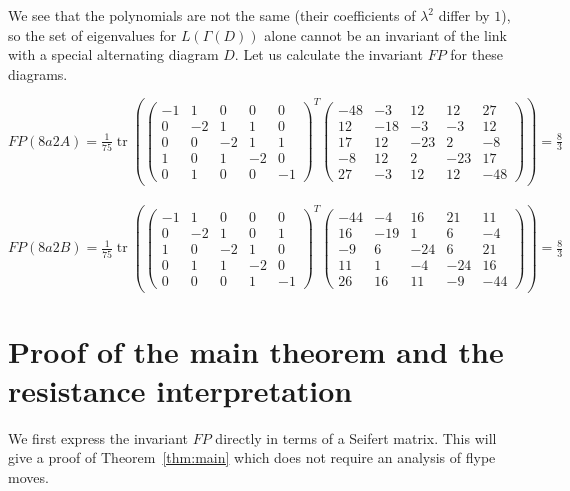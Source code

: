 \documentclass[a4paper,12pt]{amsart}
\numberwithin{equation}{section}
\theoremstyle{plain}
\theoremstyle{definition}
\begin{document}
We see that the polynomials are not the same (their coefficients of $\lambda^2$ differ by $1$), so the set of eigenvalues for $L(\Gamma(D))$ alone cannot be an invariant of the link with a special alternating diagram $D$. Let us calculate the invariant $FP$ for these diagrams.
\\ 
\par 
\noindent
$\displaystyle FP(8a2A)=\frac{1}{75}\operatorname{tr}(\begin{pmatrix}
	-1 & 1 & 0 & 0 & 0 \\
	0 & -2 & 1 & 1 & 0 \\
	0 & 0 & -2 & 1 & 1 \\
	1 & 0 & 1 & -2 & 0 \\
	0 & 1 & 0 & 0 & -1
\end{pmatrix}^T\begin{pmatrix}
	-48 & -3 & 12 & 12 & 27 \\
	12 & -18 & -3 & -3 & 12 \\
	17 & 12 & -23 & 2 & -8 \\
	-8 & 12 & 2 & -23 & 17 \\
	27 & -3 & 12 & 12 & -48
\end{pmatrix})=\frac{8}{3}$
\\ 
\ 
\\ 
\noindent
$\displaystyle FP(8a2B)=\frac{1}{75}\operatorname{tr}(\begin{pmatrix}
	-1 & 1 & 0 & 0 & 0 \\
	0 & -2 & 1 & 0 & 1 \\
	1 & 0 & -2 & 1 & 0 \\
	0 & 1 & 1 & -2 & 0 \\
	0 & 0 & 0 & 1 & -1
\end{pmatrix}^T\begin{pmatrix}
	-44 & -4 & 16 & 21 & 11 \\
	16 & -19 & 1 & 6 & -4 \\
	-9 & 6 & -24 & 6 & 21 \\
	11 & 1 & -4 & -24 & 16 \\
	26 & 16 & 11 & -9 & -44
\end{pmatrix})=\frac{8}{3}$
\\ 


\section{Proof of the main theorem and the resistance interpretation}
\label{sProof}

We first express the invariant $FP$ directly in terms of a Seifert
matrix. This will give a proof of Theorem~\ref{thm:main} which does
not require an analysis of flype moves.
\end{document}
